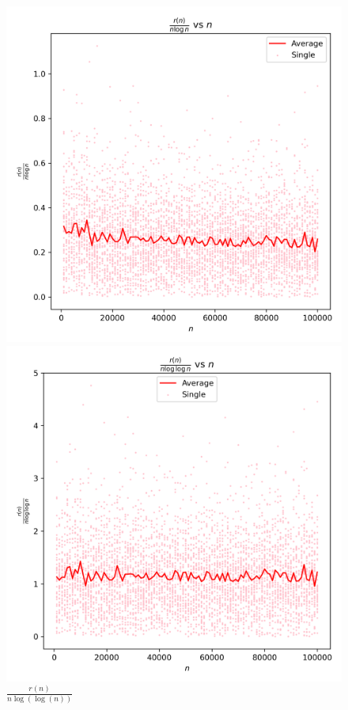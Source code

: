 \documentclass{article}
\begin{document}
\begin{figure}[H]
\begin{minipage}{0.24\textwidth}
        \caption{$\frac{r(n)}{n}$}
    \end{minipage}
        \begin{minipage}{0.24\textwidth}
        \centering
        \includegraphics[width=\linewidth]{graphs/r_factor_over_n_log_n_vs_n.png}
        \caption{$\frac{r(n)}{n \log(n)}$}
    \end{minipage}
    \begin{minipage}{0.24\textwidth}
        \centering
        \includegraphics[width=\linewidth]{graphs/r_factor_over_n_log_log_n_vs_n.png}
        \caption{$\frac{r(n)}{n \log(\log(n))}$}
    \end{minipage}
\end{figure}
\end{document}
